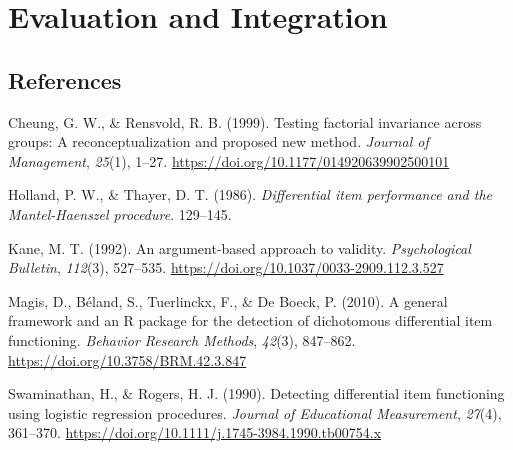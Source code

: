 \documentclass[
  11pt,
  letterpaper,
]{scrbook}
\newlength{\cslhangindent}
\newenvironment{CSLReferences}[2] %
 {\begin{list}{}{%
  \setlength{\itemindent}{0pt}
  \setlength{\leftmargin}{0pt}
  \setlength{\parsep}{0pt}
  \ifodd #1
   \setlength{\leftmargin}{\cslhangindent}
   \setlength{\itemindent}{-1\cslhangindent}
  \fi
  \setlength{\itemsep}{#2\baselineskip}}}
 {\end{list}}
\begin{document}
\part{Evaluation and Integration}

\chapter{}\label{section-10}

\chapter{}\label{section-11}


\chapter*{References}\label{references}


\label{refs}
\begin{CSLReferences}{1}{0}
Cheung, G. W., \& Rensvold, R. B. (1999). Testing factorial invariance
across groups: A reconceptualization and proposed new method.
\emph{Journal of Management}, \emph{25}(1), 1--27.
\url{https://doi.org/10.1177/014920639902500101}

Holland, P. W., \& Thayer, D. T. (1986). \emph{Differential item
performance and the {Mantel-Haenszel} procedure}. 129--145.

Kane, M. T. (1992). An argument-based approach to validity.
\emph{Psychological Bulletin}, \emph{112}(3), 527--535.
\url{https://doi.org/10.1037/0033-2909.112.3.527}

Magis, D., Béland, S., Tuerlinckx, F., \& De Boeck, P. (2010). A general
framework and an {R} package for the detection of dichotomous
differential item functioning. \emph{Behavior Research Methods},
\emph{42}(3), 847--862. \url{https://doi.org/10.3758/BRM.42.3.847}

Swaminathan, H., \& Rogers, H. J. (1990). Detecting differential item
functioning using logistic regression procedures. \emph{Journal of
Educational Measurement}, \emph{27}(4), 361--370.
\url{https://doi.org/10.1111/j.1745-3984.1990.tb00754.x}

\end{CSLReferences}


\backmatter
\end{document}
